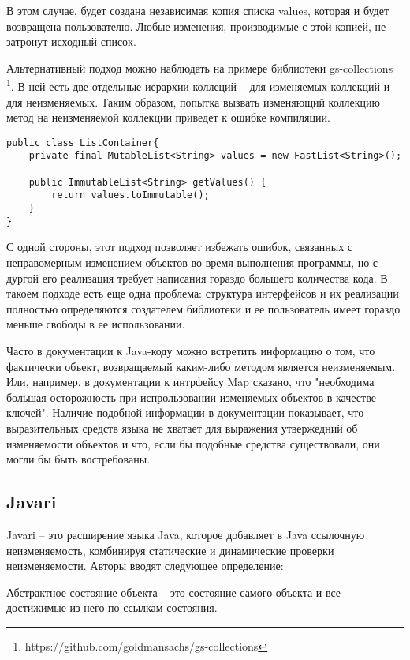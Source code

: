 В этом случае, будет создана независимая копия списка values, которая и будет возвращена пользователю. Любые изменения, производимые с этой копией, не затронут исходный список. 

Альтернативный подход можно наблюдать на примере библиотеки gs-collections \footnote{https://github.com/goldmansachs/gs-collections}. В ней есть две отдельные иерархии коллеций -- для изменяемых коллекций и для неизменяемых. Таким образом, попытка вызвать изменяющий коллекцию метод на неизменяемой коллекции приведет к ошибке компиляции.

\begin{lstlisting}[caption=Неизменяемый список, label=code:java_immutable_list]
public class ListContainer{
    private final MutableList<String> values = new FastList<String>();   
    
    public ImmutableList<String> getValues() {
        return values.toImmutable();
    }    
}
\end{lstlisting}

С одной стороны, этот подход позволяет избежать ошибок, связанных с неправомерным изменением объектов во время выполнения программы, но с дургой его реализация требует написания гораздо большего количества кода. В такоем подходе есть еще одна проблема: структура интерфейсов и их реализации полностью определяются создателем библиотеки и ее пользователь имеет гораздо меньше свободы в ее использовании. 

Часто в документации к Java-коду можно встретить информацию о том, что фактически объект, возвращаемый каким-либо методом является неизменяемым. Или, например, в документации к интрфейсу Map сказано, что "необходима большая осторожность при испрользовании изменяемых объектов в качестве ключей". Наличие подобной информации в документации показывает, что выразительных средств языка не хватает для выражения утвержедний об изменяемости объектов и что, если бы подобные средства существовали, они могли бы быть востребованы.


\subsection{Javari}

Javari \cite{Tschantz2006} -- это расширение языка Java, которое добавляет в Java ссылочную неизменяемость, комбинируя статические и динамические проверки неизменяемости. Авторы вводят следующее определение:

\begin{Def}\label{abstract_state}
Абстрактное состояние объекта -- это состояние самого объекта и все достижимые из него по ссылкам состояния.
\end{Def}

